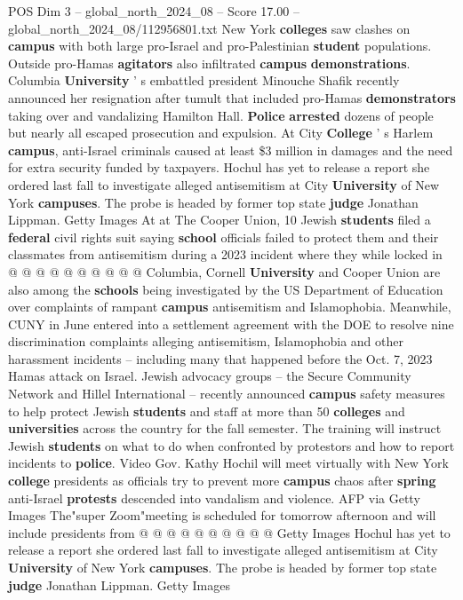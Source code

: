 \begin{textsample}{POS Dim 3 – global\_north\_2024\_08 – Score 17.00 – global\_north\_2024\_08/112956801.txt}
New York \textbf{colleges} saw clashes on \textbf{campus} with both large pro-Israel and pro-Palestinian \textbf{student} populations.
Outside pro-Hamas \textbf{agitators} also infiltrated \textbf{campus} \textbf{demonstrations}.
Columbia \textbf{University} ' s embattled president Minouche Shafik recently announced her resignation after tumult that included pro-Hamas \textbf{demonstrators} taking over and vandalizing Hamilton Hall. \textbf{Police} \textbf{arrested} dozens of people but nearly all escaped prosecution and expulsion.
At City \textbf{College} ' s Harlem \textbf{campus}, anti-Israel criminals caused at least \$3 million in damages and the need for extra security funded by taxpayers.
Hochul has yet to release a report she ordered last fall to investigate alleged antisemitism at City \textbf{University} of New York \textbf{campuses}.
The probe is headed by former top state \textbf{judge} Jonathan Lippman.
Getty Images At at The Cooper Union, 10 Jewish \textbf{students} filed a \textbf{federal} civil rights suit saying \textbf{school} officials failed to protect them and their classmates from antisemitism during a 2023 incident where they while locked in @ @ @ @ @ @ @ @ @ @ Columbia, Cornell \textbf{University} and Cooper Union are also among the \textbf{schools} being investigated by the US Department of Education over complaints of rampant \textbf{campus} antisemitism and Islamophobia.
Meanwhile, CUNY in June entered into a settlement agreement with the DOE to resolve nine discrimination complaints alleging antisemitism, Islamophobia and other harassment incidents -- including many that happened before the Oct. 7, 2023 Hamas attack on Israel.
Jewish advocacy groups -- the Secure Community Network and Hillel International -- recently announced \textbf{campus} safety measures to help protect Jewish \textbf{students} and staff at more than 50 \textbf{colleges} and \textbf{universities} across the country for the fall semester.
The training will instruct Jewish \textbf{students} on what to do when confronted by protestors and how to report incidents to \textbf{police}.
Video Gov.
Kathy Hochil will meet virtually with New York \textbf{college} presidents as officials try to prevent more \textbf{campus} chaos after \textbf{spring} anti-Israel \textbf{protests} descended into vandalism and violence.
AFP via Getty Images The"super Zoom"meeting is scheduled for tomorrow afternoon and will include presidents from @ @ @ @ @ @ @ @ @ @ Getty Images Hochul has yet to release a report she ordered last fall to investigate alleged antisemitism at City \textbf{University} of New York \textbf{campuses}.
The probe is headed by former top state \textbf{judge} Jonathan Lippman.
Getty Images

\end{textsample}
